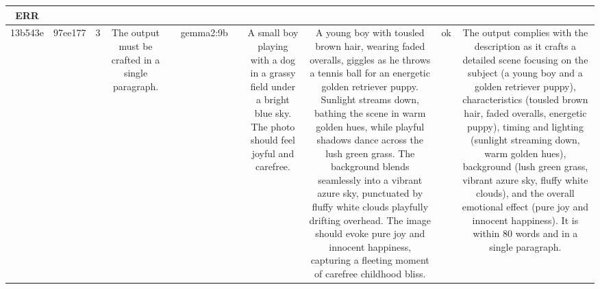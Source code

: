 \begin{table}[h!]
\begin{tabular}{|c|c|c|c|c|c|c|c|c|c|c|}
ERR\\
\hline
13b543e & 97ee177 & 3 & The output must be crafted in a single paragraph. &  & gemma2:9b &  & A small boy playing with a dog in a grassy field under a bright blue sky. The photo should feel joyful and carefree. & A young boy with tousled brown hair, wearing faded overalls, giggles as he throws a tennis ball for an energetic golden retriever puppy.  Sunlight streams down, bathing the scene in warm golden hues, while playful shadows dance across the lush green grass.  The background blends seamlessly into a vibrant azure sky, punctuated by fluffy white clouds playfully drifting overhead. The image should evoke pure joy and innocent happiness, capturing a fleeting moment of carefree childhood bliss. 


 & ok & The output complies with the description as it crafts a detailed scene focusing on the subject (a young boy and a golden retriever puppy), characteristics (tousled brown hair, faded overalls, energetic puppy), timing and lighting (sunlight streaming down, warm golden hues), background (lush green grass, vibrant azure sky, fluffy white clouds), and the overall emotional effect (pure joy and innocent happiness). It is within 80 words and in a single paragraph.


\end{tabular}
\end{table}
